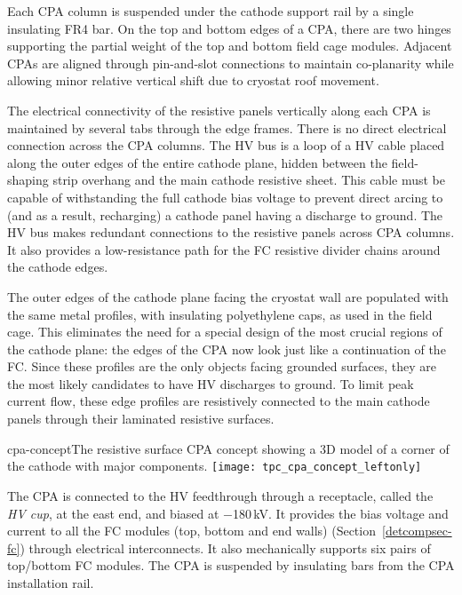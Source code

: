 Each CPA column is suspended under the cathode support rail by a single insulating FR4 bar.  On the top and bottom edges of a CPA, there are two hinges supporting the partial weight of the top and bottom field cage modules.   Adjacent CPAs are aligned through pin-and-slot connections to maintain co-planarity while allowing minor relative vertical shift due to cryostat roof movement.

The electrical connectivity of the resistive panels vertically along each CPA is maintained by several tabs through the edge frames.  There is no direct electrical connection across the CPA columns. 
%
The HV bus is a loop of a HV cable placed along the outer edges of the entire cathode plane, hidden between the field-shaping strip overhang and the main cathode resistive sheet.  This cable must be capable of withstanding the full cathode bias voltage to prevent direct arcing to (and as a result, recharging) a cathode panel having a discharge to ground. 
The HV bus makes redundant connections to the resistive panels across CPA columns.   It also provides a low-resistance path for the FC resistive divider chains around the cathode edges.

The outer edges of the cathode plane facing the cryostat wall are populated with the same metal profiles, with insulating polyethylene caps, as used in the field cage.  This eliminates the need for a special design of the most crucial regions of the cathode plane: the edges of the CPA now look just like a continuation of the FC.  Since these profiles are the only objects facing grounded surfaces, they are the most likely candidates to have HV discharges to ground.   To limit peak current flow, these edge profiles are resistively connected to the main cathode panels through their laminated resistive surfaces.  

\begin{cdrfigure}{cpa-concept}{The resistive surface CPA concept showing  
 a 3D model of a corner of the cathode with major components.} 
\texttt{[image: tpc\_cpa\_concept\_leftonly]}
\end{cdrfigure}


The CPA is connected to the HV feedthrough through a receptacle, called the \textit{HV cup}, at the east end,  and biased at $-$180\,kV.   It provides the bias voltage and current to all the FC modules (top, bottom and end walls) (Section~\ref{detcompsec-fc}) through electrical interconnects.  It also mechanically supports six pairs of top/bottom FC modules. The CPA is suspended by insulating bars from the CPA installation rail.

